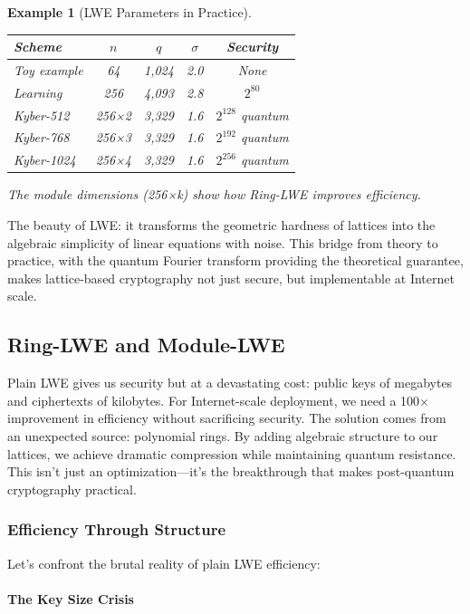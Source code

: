 \documentclass[11pt,a4paper]{article}
\newtheorem{example}{Example}
\begin{document}
\begin{example}[LWE Parameters in Practice]
\begin{center}
\begin{tabular}{|l|c|c|c|c|}
\hline
\textbf{Scheme} & \textbf{$n$} & \textbf{$q$} & \textbf{$\sigma$} & \textbf{Security} \\
\hline
Toy example & 64 & 1,024 & 2.0 & None \\
Learning & 256 & 4,093 & 2.8 & $2^{80}$ \\
Kyber-512 & 256×2 & 3,329 & 1.6 & $2^{128}$ quantum \\
Kyber-768 & 256×3 & 3,329 & 1.6 & $2^{192}$ quantum \\
Kyber-1024 & 256×4 & 3,329 & 1.6 & $2^{256}$ quantum \\
\hline
\end{tabular}
\end{center}
The module dimensions (256×k) show how Ring-LWE improves efficiency.
\end{example}

The beauty of LWE: it transforms the geometric hardness of lattices into the algebraic simplicity of linear equations with noise. This bridge from theory to practice, with the quantum Fourier transform providing the theoretical guarantee, makes lattice-based cryptography not just secure, but implementable at Internet scale.

\subsection{Ring-LWE and Module-LWE}
\label{sec:ring-lwe}

Plain LWE gives us security but at a devastating cost: public keys of megabytes and ciphertexts of kilobytes. For Internet-scale deployment, we need a 100× improvement in efficiency without sacrificing security. The solution comes from an unexpected source: polynomial rings. By adding algebraic structure to our lattices, we achieve dramatic compression while maintaining quantum resistance. This isn't just an optimization—it's the breakthrough that makes post-quantum cryptography practical.

\subsubsection{Efficiency Through Structure}

Let's confront the brutal reality of plain LWE efficiency:

\paragraph{The Key Size Crisis}
\end{document}
